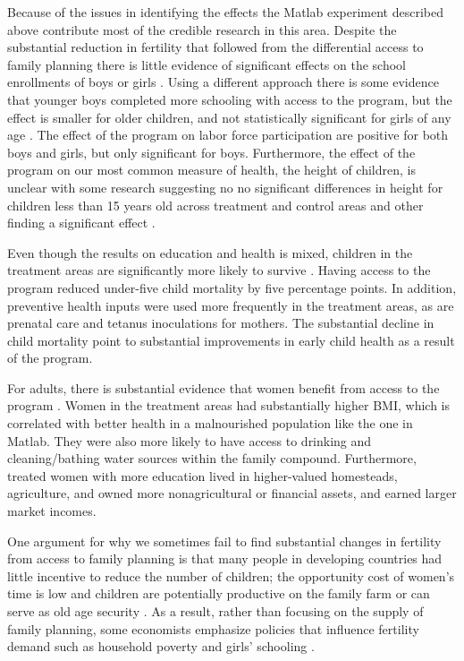 \documentclass[letterpaper,12pt]{article}
\begin{document}
Because of the issues in identifying the effects the Matlab experiment
described above contribute most of the credible research in this area.
Despite the substantial reduction in fertility that followed from 
the differential access to family planning there is little evidence
of significant effects on the school enrollments of boys or 
girls \citep{Sinha2005}.
Using a different approach there is some evidence that younger boys 
completed more schooling with access to the program, but the effect 
is smaller for older children, and not statistically significant for 
girls of any age \citep{Joshi2007}.
The effect of the program on labor force participation are positive
for both boys and girls, but only signiﬁcant for boys.
Furthermore, the effect of the program on our most common measure of health, the
height of children, is unclear with some research suggesting no
no significant differences in height for children less than 15 years 
old across treatment and control areas \citep{Joshi2007} and other
finding a significant effect \citep{Barham2012}.

Even though the results on education and health is mixed, children in the
treatment areas are significantly more likely to survive \citep{Joshi2007}.
Having access to the program reduced under-five child mortality by five
percentage points.
In addition, preventive health inputs were used more frequently in the
treatment areas, as are prenatal care and tetanus inoculations for mothers.
The substantial decline in child mortality point to substantial improvements 
in early child health as a result of the program.

For adults, there is substantial evidence that women benefit from access 
to the program \citep{Joshi2007}.
Women in the treatment areas had substantially higher BMI, which
is correlated with better health in a malnourished population like
the one in Matlab.
They were also more likely to have access to drinking and 
cleaning/bathing water sources within the family compound.
Furthermore, treated women with more education lived in higher-valued 
homesteads, agriculture, and owned more nonagricultural or financial assets,
and earned larger market incomes.



One argument for why we sometimes fail to find substantial changes in
fertility from access to family planning is that many people in 
developing countries had little incentive to reduce the number of children;
the opportunity cost of women's time is low and children are potentially 
productive on the family farm or can serve as old age security
\citep{Banerjee2014,Lambert2016}.
As a result, rather than focusing on the supply of family planning, 
some economists emphasize policies that influence fertility demand 
such as household poverty and girls' schooling 
\citep{pritchett94a,DasGupta2011}.
\end{document}
